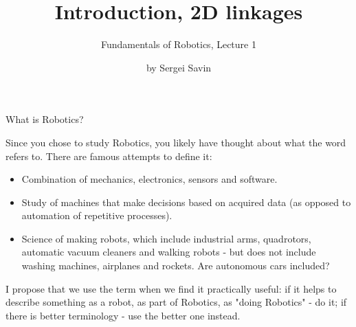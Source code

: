 \documentclass{beamer}
\title{Introduction, 2D linkages}
\subtitle{Fundamentals of Robotics, Lecture 1}
\author{by Sergei Savin}
\date{\mydate}
\begin{document}
\maketitle


%
%



\begin{frame}{What is Robotics?}
\begin{flushleft}

Since you chose to study Robotics, you likely have thought about what the word refers to. There are famous attempts to define it:

\begin{itemize}
	 \item Combination of mechanics, electronics, sensors and software.
	 \item Study of machines that make decisions based on acquired data (as opposed to automation of repetitive processes).
	 \item Science of making robots, which include industrial arms, quadrotors, automatic vacuum cleaners and walking robots - but does not include washing machines, airplanes and rockets. Are autonomous cars included?
\end{itemize}

I propose that we use the term when we find it practically useful: if it helps to describe something as a robot, as part of Robotics, as "doing Robotics" - do it; if there is better terminology - use the better one instead.

\end{flushleft}
\end{frame}
\end{document}
